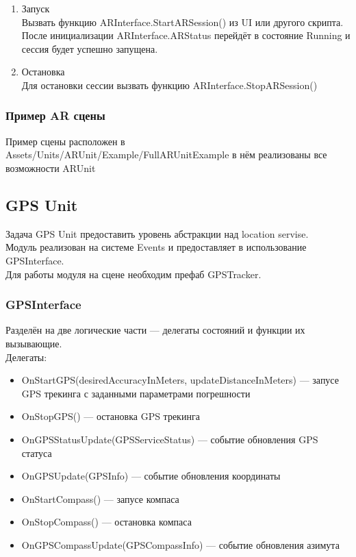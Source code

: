 \documentclass[a4paper, 11pt, titlepage]{article}
\begin{document}
\begin{enumerate}
\begin{enumerate}
\begin{enumerate}
                \end{enumerate}
              \end{enumerate}
            \item Запуск \\
            Вызвать функцию ARInterface.StartARSession() из UI или другого скрипта. После инициализации ARInterface.ARStatus 
            перейдёт в состояние Running и сессия будет успешно запущена.
            \item Остановка \\
            Для остановки сессии вызвать функцию ARInterface.StopARSession()
        \end{enumerate}
      
      \subsubsection{Пример AR сцены}
        Пример сцены расположен в Assets/Units/ARUnit/Example/FullARUnitExample в нём реализованы все возможности ARUnit

    \subsection{GPS Unit}
      Задача GPS Unit предоставить уровень абстракции над location servise.\\
      Модуль реализован на системе Events и предоставляет в использование GPSInterface.\\
      Для работы модуля на сцене необходим префаб GPSTracker.
    \subsubsection{GPSInterface}
      Разделён на две логические части --- делегаты состояний и функции их вызывающие. \\
      Делегаты:
      \begin{itemize}
        \item OnStartGPS(desiredAccuracyInMeters, updateDistanceInMeters) --- запусе GPS трекинга
        с заданными параметрами погрешности
        \item OnStopGPS() --- остановка GPS трекинга
        \item OnGPSStatusUpdate(GPSServiceStatus) --- событие обновления GPS статуса 
        \item OnGPSUpdate(GPSInfo) --- событие обновления координаты 
        \item OnStartCompass() --- запусе компаса
        \item OnStopCompass() --- остановка компаса
        \item OnGPSCompassUpdate(GPSCompassInfo) --- событие обновления азимута
      \end{itemize}
\end{document}
